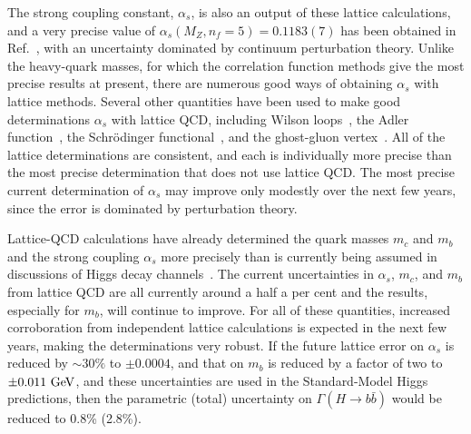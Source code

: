 \begin{itemize}
The strong coupling constant, $\alpha_s$, is also an output of these lattice calculations, and a very
precise value of $\alpha_s(M_Z, n_f=5) = 0.1183(7)$ has been obtained in Ref.~\cite{McNeile:2010ji}, 
with an uncertainty dominated by continuum perturbation theory.
Unlike the heavy-quark masses, for which the correlation function methods give the most precise
results at present, there are numerous good ways of obtaining $\alpha_s$ with lattice methods.  
Several other quantities have been used to make good determinations $\alpha_s$ with lattice QCD, including
Wilson loops~\cite{McNeile:2010ji}, the Adler function~\cite{Shintani:2010ph},
the Schr{\"o}dinger functional~\cite{Aoki:2009tf},
and the ghost-gluon vertex~\cite{Blossier:2012ef}.
All of the lattice determinations are consistent, and each is individually more precise than the most
precise determination that does not use lattice QCD.
The most precise current determination of $\alpha_s$ may improve only modestly over the next
few years, since the error is dominated by perturbation theory.

Lattice-QCD calculations have already determined the quark masses $m_c$ and $m_b$ and the strong coupling $\alpha_s$ more precisely than is currently
being assumed in discussions of Higgs decay channels~\cite{Denner:2011mq}.  The current uncertainties in $\alpha_s$, $m_c$, and $m_b$ from lattice QCD are all currently around a half a per cent and the results, especially for $m_b$, will continue to improve.  For all of these quantities, increased corroboration from independent lattice calculations is expected in the next few years, making the determinations very robust.  If the future lattice error on $\alpha_s$ is reduced by $\sim 30\%$ to $\pm 0.0004$, and that on $m_b$ is reduced by a factor of two to $\pm 0.011~{\rm GeV}$, and these uncertainties are used in the Standard-Model Higgs predictions, then the parametric (total) uncertainty on $\Gamma (H \to b \bar{b})$ would be reduced to 0.8\% (2.8\%).    


\end{itemize}
